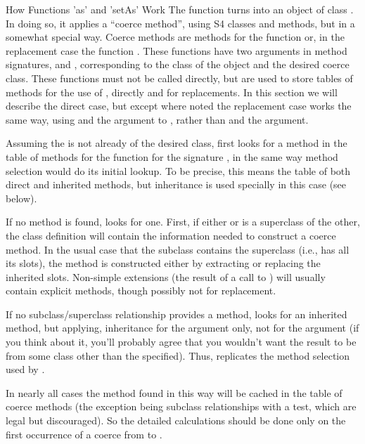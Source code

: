 \begin{Section}{How Functions 'as' and 'setAs' Work}
The function   turns  into an object
of class .  In doing so, it applies a ``coerce
method'', using S4
classes and methods, but in a somewhat special way.
Coerce methods are methods for the function  or, in the
replacement case the function .
These functions have two arguments in method signatures, 
and , corresponding to the class of the object and the
desired coerce class.
These functions must not be called directly, but are used to store
tables of methods for the use of , directly and for
replacements.
In this section we will describe the direct case, but except where
noted the replacement case works the same way, using 
and the  argument to , rather than
 and the  argument.

Assuming the  is not already of the desired class,
 first looks for a method in the table of methods
for the function
 for the signature , in the same way method selection would do its initial lookup.
To be precise, this means the table of both direct and inherited
methods, but inheritance is used specially in this case (see below).

If no method is found,  looks for one.
First, if either  or  is a superclass
of the other, the class definition will contain the information needed
to construct a coerce method.
In the usual case that the subclass contains the superclass (i.e., has
all its slots), the method is constructed either by extracting or
replacing the inherited slots.
Non-simple extensions (the result of a call to )
will usually contain explicit methods, though possibly not for replacement. 

If no subclass/superclass relationship provides a method, 
looks for an inherited method, but applying, inheritance for the argument  only, not for
the argument  (if you think about it, you'll probably agree
that you wouldn't want the result to be from some class other than the
 specified). Thus,
replicates the method selection used by .

In nearly all cases the method found in this way will be cached in the
table of coerce methods (the exception being subclass relationships with a test, which
are legal but discouraged).
So the detailed calculations should be done only on the first
occurrence of a coerce from  to .


\end{Section}
